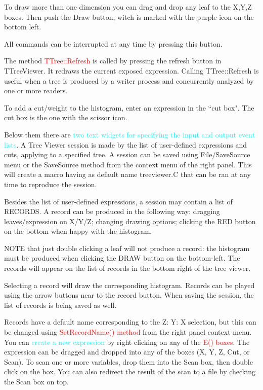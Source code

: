 \documentclass[12pt,a4paper]{article}
\begin{document}
To draw more than one dimension you can drag and drop any leaf to the X,Y,Z boxes. Then push the Draw button, witch is marked with the purple icon on the bottom left.

All commands can be interrupted at any time by pressing this button.

The method \textcolor{red}{TTree::Refresh} is called by pressing the refresh button in TTreeViewer. It redraws the current exposed expression. Calling TTree::Refresh is useful when a tree is produced by a writer process and concurrently analyzed by one or more readers.

To add a cut/weight to the histogram, enter an expression in the ``cut box". The cut box is the one with the scissor icon.

Below them there are \textcolor{cyan}{two text widgets for specifying the input and output event lists}. A Tree Viewer session is made by the list of user-defined expressions and cuts, applying to a specified tree. A session can be saved using File/SaveSource menu or the SaveSource method from the context menu of the right panel. This will create a macro having as default name treeviewer.C that can be ran at any time to reproduce the session.

Besides the list of user-defined expressions, a session may contain a list of RECORDS. A record can be produced in the following way: dragging leaves/expression on X/Y/Z; changing drawing options; clicking the RED button on the bottom when happy with the histogram.

NOTE that just double clicking a leaf will not produce a record: the histogram must be produced when clicking the
DRAW button on the bottom-left. The records will appear on the list of records in the bottom right of the tree viewer.

Selecting a record will draw the corresponding histogram. Records can be played using the arrow buttons near to the record button. When saving the session, the list of records is being saved as well.

Records have a default name corresponding to the Z: Y: X selection, but this can be changed using \textcolor{red}{SetRecordName() method} from the right panel context menu. You can \textcolor{cyan}{create a new expression} by right clicking on any of the \textcolor{red}{E() boxes}. The expression can be dragged and dropped into any of the boxes (X, Y, Z, Cut, or Scan). To scan one or more variables, drop them into the Scan box, then double click on the box. You can also redirect the result of the scan to a file by checking the Scan box on top.
\end{document}
